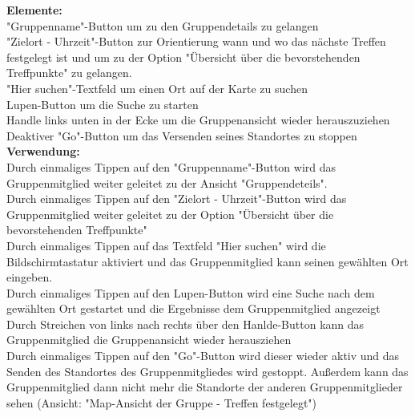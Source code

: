 \textbf{Elemente:}\\
"Gruppenname"-Button um zu den Gruppendetails zu gelangen\\
"Zielort - Uhrzeit"-Button zur Orientierung wann und wo das nächste Treffen festgelegt ist und um zu der Option "Übersicht über die bevorstehenden Treffpunkte" zu gelangen.\\
"Hier suchen"-Textfeld um einen Ort auf der Karte zu suchen\\
Lupen-Button um die Suche zu starten\\
Handle links unten in der Ecke um die Gruppenansicht wieder herauszuziehen\\
Deaktiver "Go"-Button um das Versenden seines Standortes zu stoppen\\
\textbf{Verwendung:}\\
Durch einmaliges Tippen auf den "Gruppenname"-Button wird das Gruppenmitglied weiter geleitet zu der Ansicht "Gruppendeteils".\\
Durch einmaliges Tippen auf den "Zielort - Uhrzeit"-Button wird das Gruppenmitglied weiter geleitet zu der Option "Übersicht über die bevorstehenden Treffpunkte"\\
Durch einmaliges Tippen auf das Textfeld "Hier suchen" wird die Bildschirmtastatur aktiviert und das Gruppenmitglied kann seinen gewählten Ort eingeben.\\
Durch einmaliges Tippen auf den Lupen-Button wird eine Suche nach dem gewählten Ort gestartet und die Ergebnisse dem Gruppenmitglied angezeigt\\
Durch Streichen von links nach rechts über den Hanlde-Button kann das Gruppenmitglied die Gruppenansicht wieder herausziehen\\
Durch einmaliges Tippen auf den "Go"-Button wird dieser wieder aktiv und das Senden des Standortes des Gruppenmitgliedes wird gestoppt. Außerdem kann das Gruppenmitglied dann nicht mehr die Standorte der anderen Gruppenmitglieder sehen (Ansicht: "Map-Ansicht der Gruppe - Treffen festgelegt")\\ \\